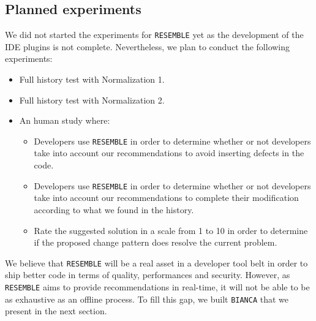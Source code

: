 \subsection{Planned experiments}

We did not started the experiments for {\tt RESEMBLE} yet as the development of the IDE plugins is not complete. Nevertheless, we plan to conduct the following experiments:

\begin{itemize}
	\item Full history test with Normalization 1.
	\item Full history test with Normalization 2.
	\item An human study where:
	\begin{itemize}
		\item Developers use {\tt RESEMBLE} in order to determine whether or not developers take into account our recommendations to avoid inserting defects in the code.
		\item Developers use {\tt RESEMBLE} in order to determine whether or not developers take into account our recommendations to complete their modification according to what we found in the history.
		\item Rate the suggested solution in a scale from 1 to 10 in order to determine if the proposed change pattern does resolve the current problem.
	\end{itemize}
\end{itemize}

We believe that {\tt RESEMBLE} will be a real asset in a developer tool belt in order to ship better code in terms of quality, performances and security.
However, as {\tt RESEMBLE} aims to provide recommendations in real-time, it will not be able to be as exhaustive as an offline process.
To fill this gap, we built {\tt BIANCA} that we present in the next section.
